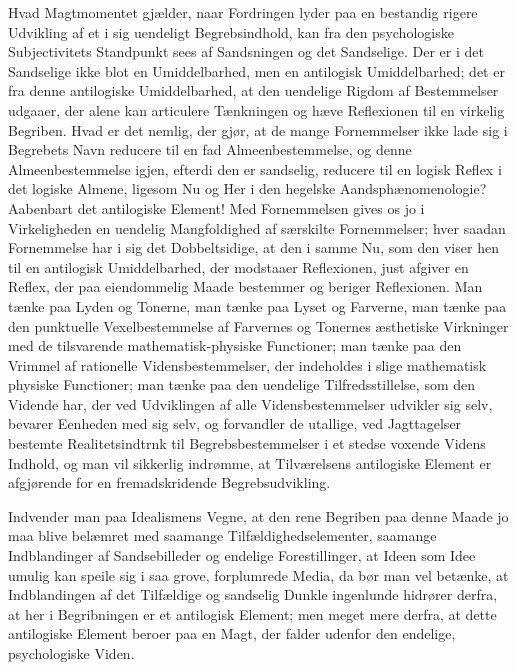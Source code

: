 \documentclass[11pt]{book}
\newcommand{\opage}[1]{\marginnote{\footnotesize\textit{[#1]}}}
\begin{document}
Hvad Magtmomentet gjælder, naar Fordringen lyder paa en bestandig
rigere Udvikling af et i sig uendeligt Begrebsindhold, kan fra den
psychologiske Subjectivitets Standpunkt sees af Sandsningen og det
Sandselige. Der er i det Sandselige ikke blot en Umiddelbarhed, men en
antilogisk Umiddelbarhed; det er fra denne antilogiske Umiddelbarhed,
at den uendelige Rigdom af Bestemmelser udgaaer, der alene kan
articulere Tænkningen og hæve Reflexionen til en virkelig Begriben.
Hvad er det nemlig, der gjør, at de mange Fornemmelser ikke lade sig i
Begrebets Navn reducere til en fad Almeenbestemmelse, og denne
Almeenbestemmelse igjen, efterdi den er sandselig, reducere til en
logisk Reflex i det logiske Almene, ligesom Nu og Her i den hegelske
Aandsphænomenologie? Aabenbart det antilogiske Element! Med
Fornemmelsen gives os jo i Virkeligheden en uendelig Mangfoldighed af
særskilte Fornemmelser; hver saadan Fornemmelse har i sig det
Dobbeltsidige, at den i samme Nu, som den
\opage{190} \setcounter{footnote}{0}%
viser hen til en antilogisk Umiddelbarhed, der modstaaer Reflexionen,
just afgiver en Reflex, der paa eiendommelig Maade bestemmer og beriger
Reflexionen. Man tænke paa Lyden og Tonerne, man tænke paa Lyset og
Farverne, man tænke paa den punktuelle Vexelbestemmelse af Farvernes og
Tonernes æsthetiske Virkninger med de tilsvarende
mathematisk-physiske Functioner; man tænke paa den Vrimmel af
rationelle Vidensbestemmelser, der indeholdes i slige mathematisk
physiske Functioner; man tænke paa den uendelige Tilfredsstillelse, som
den Vidende har, der ved Udviklingen af alle Vidensbestemmelser
udvikler sig selv, bevarer Eenheden med sig selv, og forvandler de
utallige, ved Jagttagelser bestemte Realitetsindtrnk til
Begrebsbestemmelser i et stedse voxende Videns Indhold, og man vil
sikkerlig indrømme, at Tilværelsens antilogiske Element er afgjørende
for en fremadskridende Begrebsudvikling.

Indvender man paa Idealismens Vegne, at den rene Begriben paa denne
Maade jo maa blive belæmret med saamange Tilfældighedselementer,
saamange Indblandinger af Sandsebilleder og endelige Forestillinger, at
Ideen som Idee umulig kan speile sig i saa grove, forplumrede Media, da
bør man vel betænke, at Indblandingen af det Tilfældige og sandselig
Dunkle ingenlunde hidrører derfra, at her i Begribningen er et
antilogisk Element; men meget mere derfra, at dette antilogiske Element
beroer paa en Magt, der falder udenfor den endelige, psychologiske
Viden.
\end{document}
